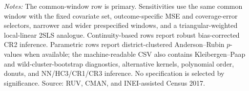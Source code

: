 \begin{minipage}{0.98\linewidth}\footnotesize\textit{Notes:} The common-window row is primary. Sensitivities use the same common window with the fixed covariate set, outcome-specific MSE and coverage-error selectors, narrower and wider prespecified windows, and a triangular-weighted local-linear 2SLS analogue. Continuity-based rows report robust bias-corrected CR2 inference. Parametric rows report district-clustered Anderson--Rubin \(p\)-values when available; the machine-readable CSV also contains Kleibergen--Paap and wild-cluster-bootstrap diagnostics, alternative kernels, polynomial order, donuts, and NN/HC3/CR1/CR3 inference. No specification is selected by significance. Source: RUV, CMAN, and INEI-assisted Census 2017.\end{minipage}
\endgroup
